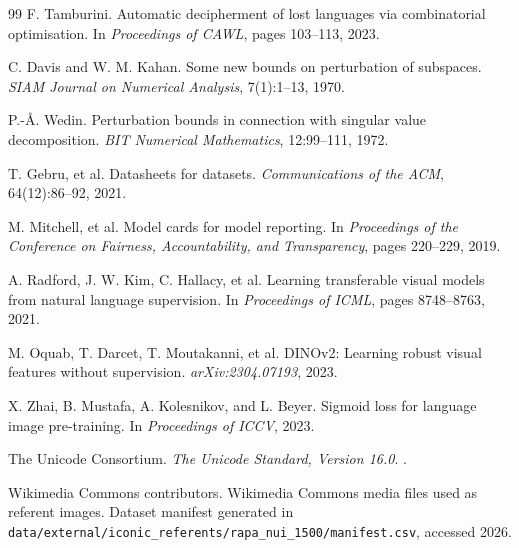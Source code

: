 \documentclass[11pt,a4paper]{article}
\newcommand{\1}{\mathbf{1}}
\numberwithin{equation}{section}
\begin{document}
\begin{thebibliography}{99}
F. Tamburini.
\newblock Automatic decipherment of lost languages via combinatorial optimisation.
\newblock In \emph{Proceedings of CAWL}, pages 103--113, 2023.

C. Davis and W. M. Kahan.
\newblock Some new bounds on perturbation of subspaces.
\newblock \emph{SIAM Journal on Numerical Analysis}, 7(1):1--13, 1970.

P.-\AA. Wedin.
\newblock Perturbation bounds in connection with singular value decomposition.
\newblock \emph{BIT Numerical Mathematics}, 12:99--111, 1972.

T. Gebru, et al.
\newblock Datasheets for datasets.
\newblock \emph{Communications of the ACM}, 64(12):86--92, 2021.

M. Mitchell, et al.
\newblock Model cards for model reporting.
\newblock In \emph{Proceedings of the Conference on Fairness, Accountability, and Transparency}, pages 220--229, 2019.

A. Radford, J. W. Kim, C. Hallacy, et al.
\newblock Learning transferable visual models from natural language supervision.
\newblock In \emph{Proceedings of ICML}, pages 8748--8763, 2021.

M. Oquab, T. Darcet, T. Moutakanni, et al.
\newblock DINOv2: Learning robust visual features without supervision.
\newblock \emph{arXiv:2304.07193}, 2023.

X. Zhai, B. Mustafa, A. Kolesnikov, and L. Beyer.
\newblock Sigmoid loss for language image pre-training.
\newblock In \emph{Proceedings of ICCV}, 2023.

The Unicode Consortium.
\newblock \emph{The Unicode Standard, Version 16.0}.
.

Wikimedia Commons contributors.
\newblock Wikimedia Commons media files used as referent images.
\newblock Dataset manifest generated in \texttt{data/external/iconic\_referents/rapa\_nui\_1500/manifest.csv}, accessed 2026.

\end{thebibliography}
\end{document}
